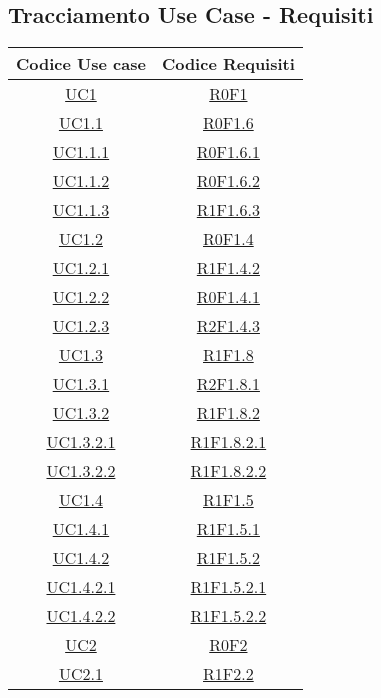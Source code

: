 \subsection{Tracciamento Use Case - Requisiti}
\normalsize
\begin{longtable}{|c|c|}
\hline
\textbf{Codice Use case} & \textbf{Codice Requisiti} \\
\hline
\endhead
\hyperlink{UC1}{UC1} & \hyperlink{R0F1}{R0F1}\\
\hline
\hyperlink{UC1.1}{UC1.1} & \hyperlink{R0F1.6}{R0F1.6}\\
\hline
\hyperlink{UC1.1.1}{UC1.1.1} & \hyperlink{R0F1.6.1}{R0F1.6.1}\\
\hline
\hyperlink{UC1.1.2}{UC1.1.2} & \hyperlink{R0F1.6.2}{R0F1.6.2}\\
\hline
\hyperlink{UC1.1.3}{UC1.1.3} & \hyperlink{R1F1.6.3}{R1F1.6.3}\\
\hline
\hyperlink{UC1.2}{UC1.2} & \hyperlink{R0F1.4}{R0F1.4}\\
\hline
\hyperlink{UC1.2.1}{UC1.2.1} & \hyperlink{R1F1.4.2}{R1F1.4.2}\\
\hline
\hyperlink{UC1.2.2}{UC1.2.2} & \hyperlink{R0F1.4.1}{R0F1.4.1}\\
\hline
\hyperlink{UC1.2.3}{UC1.2.3} & \hyperlink{R2F1.4.3}{R2F1.4.3}\\
\hline
\hyperlink{UC1.3}{UC1.3} & \hyperlink{R1F1.8}{R1F1.8}\\
\hline
\hyperlink{UC1.3.1}{UC1.3.1} & \hyperlink{R2F1.8.1}{R2F1.8.1}\\
\hline
\hyperlink{UC1.3.2}{UC1.3.2} & \hyperlink{R1F1.8.2}{R1F1.8.2}\\
\hline
\hyperlink{UC1.3.2.1}{UC1.3.2.1} & \hyperlink{R1F1.8.2.1}{R1F1.8.2.1}\\
\hline
\hyperlink{UC1.3.2.2}{UC1.3.2.2} & \hyperlink{R1F1.8.2.2}{R1F1.8.2.2}\\
\hline
\hyperlink{UC1.4}{UC1.4} & \hyperlink{R1F1.5}{R1F1.5}\\
\hline
\hyperlink{UC1.4.1}{UC1.4.1} & \hyperlink{R1F1.5.1}{R1F1.5.1}\\
\hline
\hyperlink{UC1.4.2}{UC1.4.2} & \hyperlink{R1F1.5.2}{R1F1.5.2}\\
\hline
\hyperlink{UC1.4.2.1}{UC1.4.2.1} & \hyperlink{R1F1.5.2.1}{R1F1.5.2.1}\\
\hline
\hyperlink{UC1.4.2.2}{UC1.4.2.2} & \hyperlink{R1F1.5.2.2}{R1F1.5.2.2}\\
\hline
\hyperlink{UC2}{UC2} & \hyperlink{R0F2}{R0F2}\\
\hline
\hyperlink{UC2.1}{UC2.1} & \hyperlink{R1F2.2}{R1F2.2}\\

\end{longtable}
